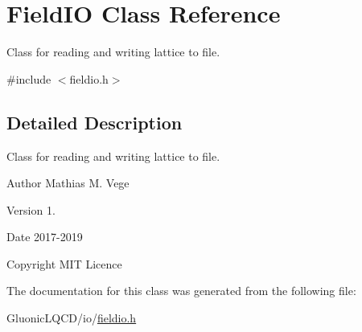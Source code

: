\hypertarget{class_field_i_o}{}\section{Field\+IO Class Reference}
\label{class_field_i_o}


Class for reading and writing lattice to file.  




{\ttfamily \#include $<$fieldio.\+h$>$}



\subsection{Detailed Description}
Class for reading and writing lattice to file. 

\begin{DoxyAuthor}{Author}
Mathias M. Vege 
\end{DoxyAuthor}
\begin{DoxyVersion}{Version}
1. 
\end{DoxyVersion}
\begin{DoxyDate}{Date}
2017-\/2019 
\end{DoxyDate}
\begin{DoxyCopyright}{Copyright}
M\+IT Licence 
\end{DoxyCopyright}


The documentation for this class was generated from the following file\+:\begin{DoxyCompactItemize}
\item 
Gluonic\+L\+Q\+C\+D/io/\mbox{\hyperlink{fieldio_8h}{fieldio.\+h}}\end{DoxyCompactItemize}
